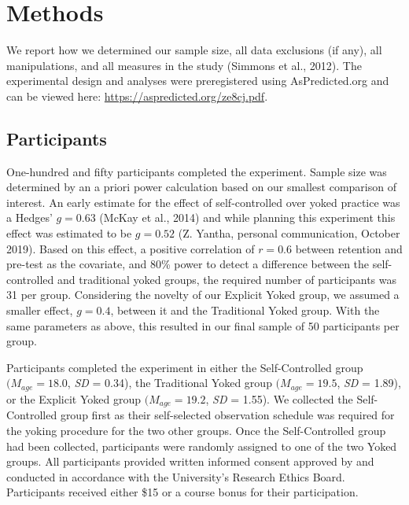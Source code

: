 \documentclass[
  english,
  jou]{apa7}
\begin{document}
\hypertarget{methods}{%
\section{Methods}\label{methods}}

We report how we determined our sample size, all data exclusions (if any), all manipulations, and all measures in the study (Simmons et al., 2012). The experimental design and analyses were preregistered using AsPredicted.org and can be viewed here: \url{https://aspredicted.org/ze8cj.pdf}.

\hypertarget{participants}{%
\subsection{Participants}\label{participants}}

One-hundred and fifty participants completed the experiment. Sample size was determined by an a priori power calculation based on our smallest comparison of interest. An early estimate for the effect of self-controlled over yoked practice was a Hedges' \(g = 0.63\) (McKay et al., 2014) and while planning this experiment this effect was estimated to be \(g = 0.52\) (Z. Yantha, personal communication, October 2019). Based on this effect, a positive correlation of \(r = 0.6\) between retention and pre-test as the covariate, and 80\% power to detect a difference between the self-controlled and traditional yoked groups, the required number of participants was 31 per group. Considering the novelty of our Explicit Yoked group, we assumed a smaller effect, \(g = 0.4\), between it and the Traditional Yoked group. With the same parameters as above, this resulted in our final sample of 50 participants per group.

Participants completed the experiment in either the Self-Controlled group \((M_{age} = 18.0\), \emph{SD} = 0.34), the Traditional Yoked group \((M_{age} = 19.5\), \emph{SD} = 1.89), or the Explicit Yoked group \((M_{age} = 19.2\), \emph{SD} = 1.55). We collected the Self-Controlled group first as their self-selected observation schedule was required for the yoking procedure for the two other groups. Once the Self-Controlled group had been collected, participants were randomly assigned to one of the two Yoked groups. All participants provided written informed consent approved by and conducted in accordance with the University's Research Ethics Board. Participants received either \$15 or a course bonus for their participation.
\end{document}
